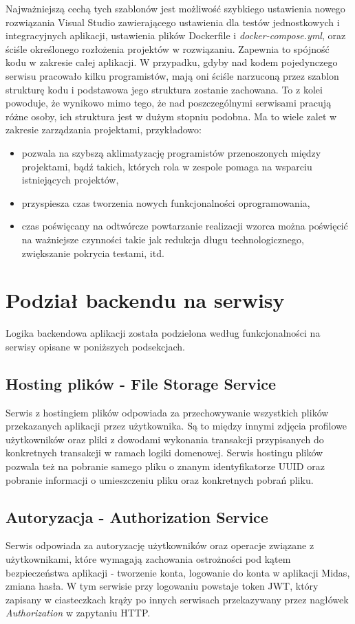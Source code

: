 \documentclass{SGGW-thesis}
\begin{document}
  Najważniejszą cechą tych szablonów jest możliwość szybkiego ustawienia nowego rozwiązania Visual Studio zawierającego ustawienia dla testów jednostkowych i integracyjnych aplikacji, ustawienia plików Dockerfile i \textit{docker-compose.yml}, oraz ściśle określonego rozłożenia projektów w rozwiązaniu. Zapewnia to spójność kodu w zakresie całej aplikacji. W przypadku, gdyby nad kodem pojedynczego serwisu pracowało kilku programistów, mają oni ściśle narzuconą przez szablon strukturę kodu i podstawowa jego struktura zostanie zachowana. To z kolei powoduje, że wynikowo mimo tego, że nad poszczególnymi serwisami pracują różne osoby, ich struktura jest w dużym stopniu podobna. Ma to wiele zalet w zakresie zarządzania projektami, przykładowo:

  \begin{itemize}
    \item pozwala na szybszą aklimatyzację programistów przenoszonych między projektami, bądź takich, których rola w zespole pomaga na wsparciu istniejących projektów,
    \item przyspiesza czas tworzenia nowych funkcjonalności oprogramowania,
    \item czas poświęcany na odtwórcze powtarzanie realizacji wzorca można poświęcić na ważniejsze czynności takie jak redukcja długu technologicznego, zwiększanie pokrycia testami, itd.
  \end{itemize}

  \section{Podział backendu na serwisy}
    Logika backendowa aplikacji została podzielona według funkcjonalności na serwisy opisane w poniższych podsekcjach.

    \subsection{Hosting plików - File Storage Service}
    Serwis z hostingiem plików odpowiada za przechowywanie wszystkich plików przekazanych aplikacji przez użytkownika. Są to między innymi zdjęcia profilowe użytkowników oraz pliki z dowodami wykonania transakcji przypisanych do konkretnych transakcji w ramach logiki domenowej. Serwis hostingu plików pozwala też na pobranie samego pliku o znanym identyfikatorze UUID oraz pobranie informacji o umieszczeniu pliku oraz konkretnych pobrań pliku.
    
    \subsection{Autoryzacja - Authorization Service}
    Serwis odpowiada za autoryzację użytkowników oraz operacje związane z użytkownikami, które wymagają zachowania ostrożności pod kątem bezpieczeństwa aplikacji - tworzenie konta, logowanie do konta w aplikacji Midas, zmiana hasła. W tym serwisie przy logowaniu powstaje token JWT, który zapisany w ciasteczkach krąży po innych serwisach przekazywany przez nagłówek \textit{Authorization} w zapytaniu HTTP. 
\end{document}
